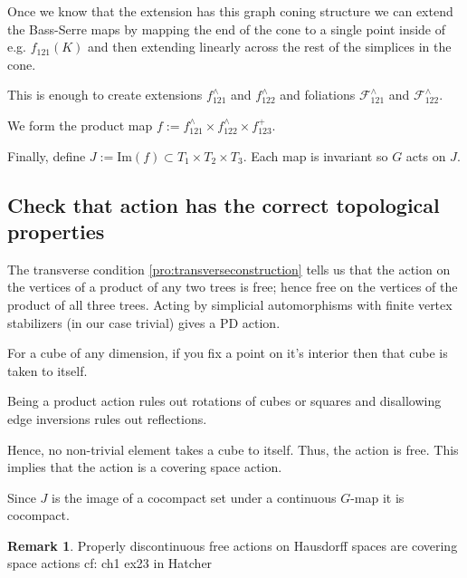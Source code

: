 \documentclass[12pt,parskip=full]{report}
\theoremstyle{plain}
\theoremstyle{definition}
\newtheorem{rmk}[thm]{Remark}
\begin{document}
        Once we know that the extension has this graph coning structure we can extend the Bass-Serre maps by mapping the end of the cone to a single point inside of e.g. \(f_{121}(K)\) and then extending linearly across the rest of the simplices in the cone.
        
        This is enough to create extensions \(f_{121}^{\wedge}\) and \(f_{122}^{\wedge}\) and foliations \(\mathscr{F}^{\wedge}_{121}\) and \(\mathscr{F}^{\wedge}_{122}\). 
        
         We form the product map \(f:= f_{121}^{\wedge} \times f_{122}^{\wedge} \times f_{123}^{+}\). 
        
        Finally, define \(J := \text{Im}(f) \subset T_1\times T_2\times T_3\). Each map is invariant so \(G\) acts on \(J\).
        
    \subsection{Check that action has the correct topological properties}
        The transverse condition \ref{pro:transverseconstruction} tells us that the action on the vertices of a product of any two trees is free; hence free on the vertices of the product of all three trees. Acting by simplicial automorphisms with finite vertex stabilizers (in our case trivial) gives a PD action. 
        
        For a cube of any dimension, if you fix a point on it's interior then that cube is taken to itself.
        
        Being a product action rules out rotations of cubes or squares and disallowing edge inversions rules out reflections.
        
        Hence, no non-trivial element takes a cube to itself. Thus, the action is free. This implies that the action is a covering space action.
        
        Since \(J\) is the image of a cocompact set under a continuous \(G\)-map it is cocompact.
        
        \begin{rmk}
            Properly discontinuous free actions on Hausdorff spaces are covering space actions cf: ch1 ex23 in Hatcher
        \end{rmk}
        
        
        
        
        
        
        
        
        
\end{document}
